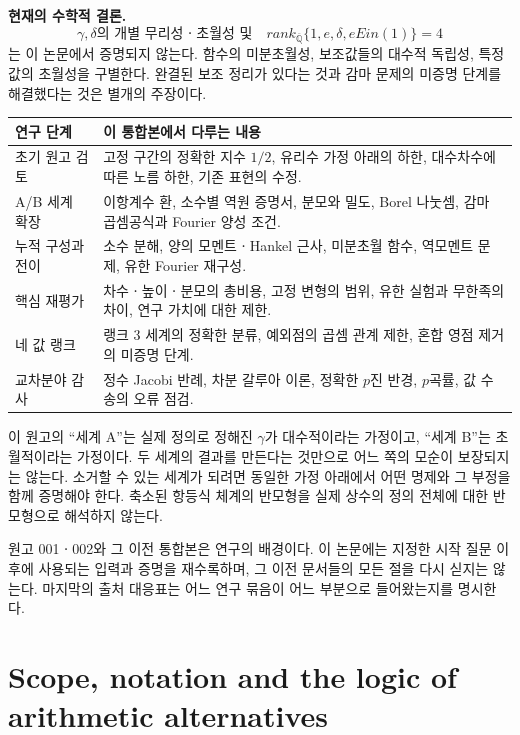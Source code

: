 \documentclass[11pt,a4paper]{article}
\theoremstyle{definition}
\theoremstyle{remark}
\theoremstyle{plain}
\numberwithin{equation}{section}
\def\operatorname#1{#1}\def\mathrm#1{#1}}
\begin{document}
\medskip
\noindent\textbf{현재의 수학적 결론.}
\[
 \gamma,\delta\text{의 개별 무리성ㆍ초월성 및}
 \quad\operatorname{rank}_{\overline{\mathbb Q}}
 \{1,e,\delta,e\operatorname{Ein}(1)\}=4
\]
는 이 논문에서 증명되지 않는다. 함수의 미분초월성, 보조값들의
대수적 독립성, 특정 값의 초월성을 구별한다. 완결된 보조 정리가 있다는
것과 감마 문제의 미증명 단계를 해결했다는 것은 별개의 주장이다.

\medskip
\noindent\begin{tabularx}{\textwidth}{@{}p{}X@{}}
\toprule
연구 단계 & 이 통합본에서 다루는 내용 \\
\midrule
초기 원고 검토 & 고정 구간의 정확한 지수 $1/2$, 유리수 가정 아래의 하한,
대수차수에 따른 노름 하한, 기존 표현의 수정. \\
A/B 세계 확장 & 이항계수 환, 소수별 역원 증명서, 분모와 밀도,
Borel 나눗셈, 감마 곱셈공식과 Fourier 양성 조건. \\
누적 구성과 전이 & 소수 분해, 양의 모멘트ㆍHankel 근사,
미분초월 함수, 역모멘트 문제, 유한 Fourier 재구성. \\
핵심 재평가 & 차수ㆍ높이ㆍ분모의 총비용, 고정 변형의 범위,
유한 실험과 무한족의 차이, 연구 가치에 대한 제한. \\
네 값 랭크 & 랭크 $3$ 세계의 정확한 분류,
예외점의 곱셈 관계 제한, 혼합 영점 제거의 미증명 단계. \\
교차분야 감사 & 정수 Jacobi 반례, 차분 갈루아 이론,
정확한 $p$진 반경, $p$곡률, 값 수송의 오류 점검. \\
\bottomrule
\end{tabularx}

\medskip
이 원고의 ``세계 A''는 실제 정의로 정해진 $\gamma$가 대수적이라는
가정이고, ``세계 B''는 초월적이라는 가정이다. 두 세계의 결과를
만든다는 것만으로 어느 쪽의 모순이 보장되지는 않는다. 소거할 수 있는
세계가 되려면 동일한 가정 아래에서 어떤 명제와 그 부정을 함께
증명해야 한다. 축소된 항등식 체계의 반모형을 실제 상수의 정의 전체에
대한 반모형으로 해석하지 않는다.

\medskip
원고 001ㆍ002와 그 이전 통합본은 연구의 배경이다. 이 논문에는
지정한 시작 질문 이후에 사용되는 입력과 증명을 재수록하며, 그 이전
문서들의 모든 절을 다시 싣지는 않는다. 마지막의 출처 대응표는
어느 연구 묶음이 어느 부분으로 들어왔는지를 명시한다.

\clearpage
\tableofcontents
\clearpage

\section{Scope, notation and the logic of arithmetic alternatives}
\label{int:scope}
\end{document}
